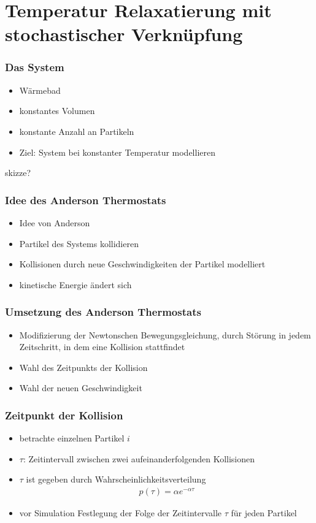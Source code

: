 \documentclass{beamer}
\begin{document}
\section{Temperatur Relaxatierung mit stochastischer Verknüpfung}
\begin{frame}
	\frametitle{Das System}
	\begin{itemize}
		\item Wärmebad
		\item konstantes Volumen
		\item konstante Anzahl an Partikeln
		\item Ziel: System bei konstanter Temperatur modellieren 
	\end{itemize}
	skizze?
\end{frame}

\begin{frame} 
	\frametitle{Idee des Anderson Thermostats} 
	\begin{itemize}
		\item Idee von Anderson
		\item Partikel des Systems kollidieren
		\item Kollisionen durch neue Geschwindigkeiten der Partikel modelliert
		\item kinetische Energie ändert sich
	\end{itemize}
\end{frame}


\begin{frame} 
	\frametitle{Umsetzung des Anderson Thermostats}
	\begin{itemize}
		\item Modifizierung der Newtonschen Bewegungsgleichung, durch Störung  in jedem Zeitschritt, in dem eine Kollision stattfindet
		\item Wahl des Zeitpunkts der Kollision
		\item Wahl der neuen Geschwindigkeit
	\end{itemize} 
\end{frame}

\begin{frame} 
	\frametitle{Zeitpunkt der Kollision}
	\begin{itemize}
		\item betrachte einzelnen Partikel $i$
		\item $\tau$: Zeitintervall zwischen zwei aufeinanderfolgenden Kollisionen
		\item $\tau$ ist gegeben durch Wahrscheinlichkeitsverteilung
		\begin{align*}
		p(\tau)= \alpha e^{- \alpha \tau}
		\end{align*}
		\item vor Simulation Festlegung der Folge der Zeitintervalle $\tau$ für jeden Partikel
	\end{itemize} 
\end{frame}
\end{document}
